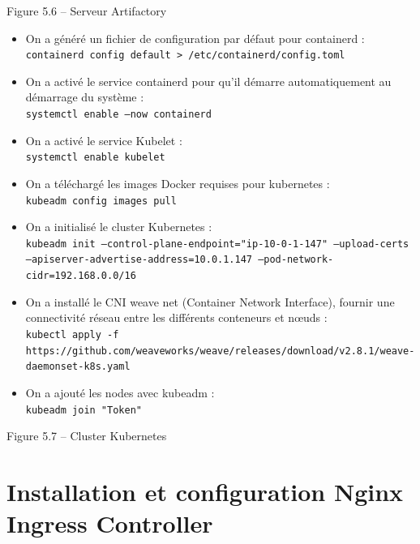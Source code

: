 \begin{center}
Figure 5.6 – Serveur Artifactory
\end{center}
\begin{itemize}

\item On a généré un fichier de configuration par défaut pour containerd : \\
\texttt{containerd config default > /etc/containerd/config.toml}

\item On a activé le service containerd pour qu’il démarre automatiquement au démarrage du système : \\
\texttt{systemctl enable --now containerd}

\item On a activé le service Kubelet : \\
\texttt{systemctl enable kubelet}

\item On a téléchargé les images Docker requises pour kubernetes : \\
\texttt{kubeadm config images pull}

\item On a initialisé le cluster Kubernetes : \\
\texttt{kubeadm init --control-plane-endpoint="ip-10-0-1-147" --upload-certs --apiserver-advertise-address=10.0.1.147 --pod-network-cidr=192.168.0.0/16}

\item On a installé le CNI weave net (Container Network Interface), fournir une connectivité réseau entre les différents conteneurs et nœuds : \\
\texttt{kubectl apply -f https://github.com/weaveworks/weave/releases/download/v2.8.1/weave-daemonset-k8s.yaml}

\item On a ajouté les nodes avec kubeadm : \\
\texttt{kubeadm join "Token"}

\end{itemize}

\begin{center}
Figure 5.7 – Cluster Kubernetes
\end{center}

\section*{Installation et configuration Nginx Ingress Controller}

